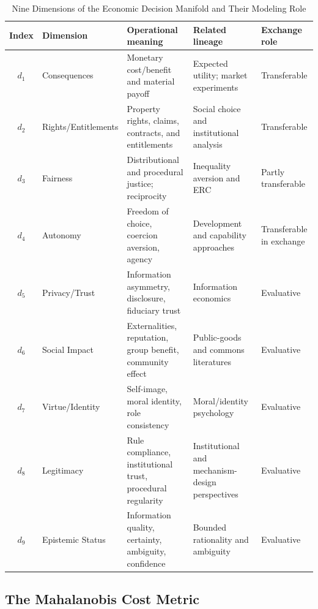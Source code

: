 \documentclass[journal]{IEEEtran}
\begin{document}
\begin{table}[!t]
\renewcommand{\arraystretch}{1.15}
\caption{Nine Dimensions of the Economic Decision Manifold and Their Modeling Role}
\label{tab:dimensions}
\centering
\begin{tabular}{c p{} p{} p{} p{}}
\toprule
\textbf{Index} & \textbf{Dimension} & \textbf{Operational meaning} & \textbf{Related lineage} & \textbf{Exchange role} \\
\midrule
$d_1$ & Consequences & Monetary cost/benefit and material payoff & Expected utility; market experiments~\cite{vonneumann1944,smith1962} & Transferable \\
$d_2$ & Rights/Entitlements & Property rights, claims, contracts, and entitlements & Social choice and institutional analysis~\cite{arrow1951,ostrom1990} & Transferable \\
$d_3$ & Fairness & Distributional and procedural justice; reciprocity & Inequality aversion and ERC~\cite{fehr1999,bolton2000} & Partly transferable \\
$d_4$ & Autonomy & Freedom of choice, coercion aversion, agency & Development and capability approaches~\cite{sen1999} & Transferable in exchange \\
$d_5$ & Privacy/Trust & Information asymmetry, disclosure, fiduciary trust & Information economics~\cite{akerlof1970,stiglitz1981} & Evaluative \\
$d_6$ & Social Impact & Externalities, reputation, group benefit, community effect & Public-goods and commons literatures~\cite{ostrom1990,camerer2003} & Evaluative \\
$d_7$ & Virtue/Identity & Self-image, moral identity, role consistency & Moral/identity psychology~\cite{haidt2012,tetlock2000} & Evaluative \\
$d_8$ & Legitimacy & Rule compliance, institutional trust, procedural regularity & Institutional and mechanism-design perspectives~\cite{ostrom1990,thaler2008} & Evaluative \\
$d_9$ & Epistemic Status & Information quality, certainty, ambiguity, confidence & Bounded rationality and ambiguity~\cite{simon1955,ellsberg1961} & Evaluative \\
\bottomrule
\end{tabular}
\end{table}

\subsection{The Mahalanobis Cost Metric}
\end{document}
